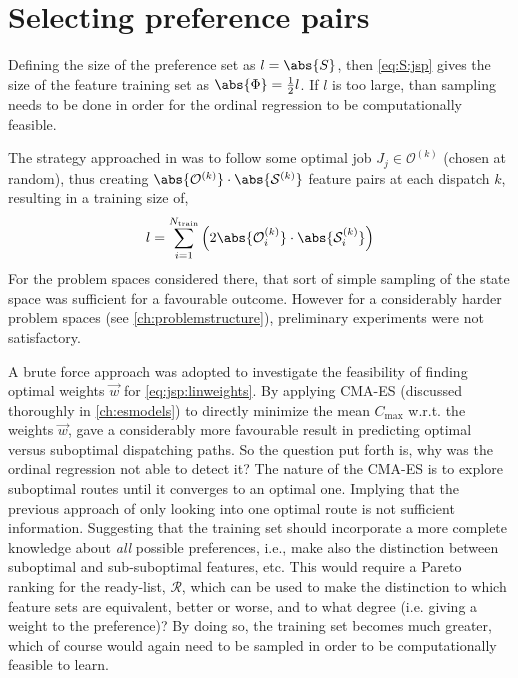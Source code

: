 \section{Selecting preference pairs}\label{sec:S:strategies}
Defining the size of the preference set as $l=\abs{S}$, then \cref{eq:S:jsp} gives the size of the feature training set as $\abs{\Phi}=\frac{1}{2}l$.
If $l$ is too large, than sampling needs to be done in order for the ordinal regression to be computationally feasible.


The strategy approached in  \cite{InRu11a} was to follow some optimal job $J_j\in\mathcal{O}^{(k)}$ (chosen at random), thus creating $\abs{\mathcal{O}^{(k)}}\cdot\abs{\mathcal{S}^{(k)}}$ feature pairs at each dispatch $k$, resulting in a training size of,
\begin{equation}\label{eq:sizeS_b}
l =  \sum_{i=1}^{N_{\text{train}}} \left(2 \abs{\mathcal{O}^{(k)}_i}\cdot \abs{\mathcal{S}^{(k)}_i} \right)
\end{equation}
For the problem spaces considered there, that sort of simple sampling of the state space was sufficient for a favourable outcome. However for a considerably harder problem spaces (see \cref{ch:problemstructure}), preliminary experiments were not satisfactory. 

A brute force approach was adopted to investigate the feasibility of finding optimal weights $\vec{w}$ for \cref{eq:jsp:linweights}. 
By applying CMA-ES (discussed thoroughly in \cref{ch:esmodels}) to directly minimize the mean $C_{\max}$  w.r.t. the weights $\vec{w}$, gave a considerably more favourable result in predicting optimal versus suboptimal dispatching paths. 
So the question put forth is, why was the ordinal regression not able to detect it?
The nature of the CMA-ES is to explore suboptimal routes until it converges to an optimal one. 
Implying that the previous approach of only looking into one optimal route is not sufficient information. 
Suggesting that the training set should incorporate a more complete knowledge about \emph{all} possible preferences, i.e., make also the distinction between suboptimal and sub-suboptimal features, etc.  
This would require a Pareto ranking for the ready-list, $\mathcal{R}$, which can be used to make the distinction to which feature sets are equivalent, better or worse, and to what degree (i.e. giving a weight to the preference)? 
By doing so, the training set becomes much greater, which of course would again need to be sampled in order to be computationally feasible to learn. 

